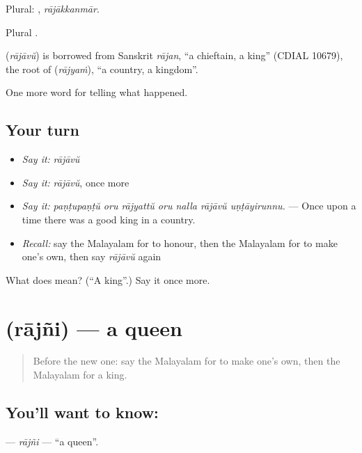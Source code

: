 Plural: , \emph{rājākkanmār}.

Plural .

\begin{cousinweb}
\textbf{} (\emph{rājāvŭ}) is borrowed from Sanskrit \emph{rājan}, \textquotedblleft{}a chieftain, a king\textquotedblright{} (CDIAL 10679), the root of  (\emph{rājyaṁ}), \textquotedblleft{}a country, a kingdom\textquotedblright{}.
\end{cousinweb}

\begin{grammarlens}[title={What you've built}]
One more word for telling what happened.
\end{grammarlens}

\subsection*{Your turn}
\begin{itemize}
\raggedright
  \item \emph{Say it:} \emph{rājāvŭ}
  \item \emph{Say it:} \emph{rājāvŭ}, once more
  \item \emph{Say it:} \emph{paṇṭupaṇṭŭ oru rājyattŭ oru nalla rājāvŭ uṇṭāyirunnu.} — Once upon a time there was a good king in a country.
  \item \emph{Recall:} say the Malayalam for to honour, then the Malayalam for to make one's own, then say \emph{rājāvŭ} again
\end{itemize}

\begin{tcolorbox}[breakable,colback=teal!4,colframe=teal!35!black,title={Before you move on}]
What does  mean? (\textquotedblleft{}A king\textquotedblright{}.) Say it once more.
\end{tcolorbox}
\section[\texorpdfstring{\ml{രാജ്ഞി} (rājñi)}{രാജ്ഞി (rājñi)}]{ (rājñi) — a queen}

\label{lesson:ML-C397-rajni}



\begin{quote}
Before the new one: say the Malayalam for to make one's own, then the Malayalam for a king.
\end{quote}

\subsection*{You'll want to know: }
\textbf{} — \emph{rājñi} — \textquotedblleft{}a queen\textquotedblright{}.


